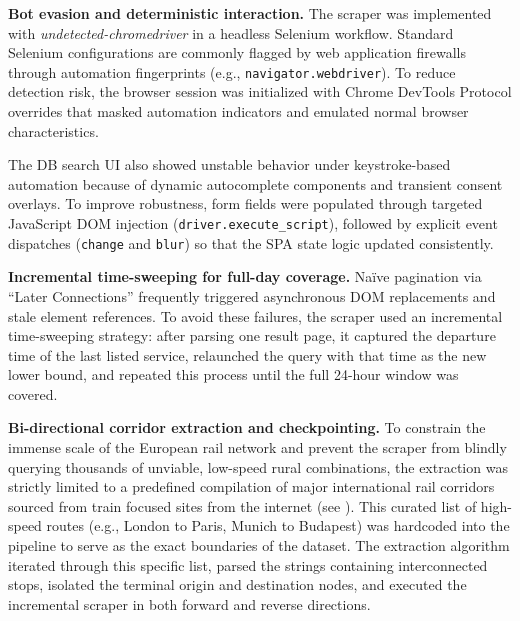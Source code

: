 \medskip

\noindent\textbf{Bot evasion and deterministic interaction.}
The scraper was implemented with \textit{undetected-chromedriver} in a headless Selenium workflow. Standard Selenium configurations are commonly flagged by web application firewalls through automation fingerprints (e.g., \texttt{navigator.webdriver}). To reduce detection risk, the browser session was initialized with Chrome DevTools Protocol overrides that masked automation indicators and emulated normal browser characteristics.

\medskip

The DB search UI also showed unstable behavior under keystroke-based automation because of dynamic autocomplete components and transient consent overlays. To improve robustness, form fields were populated through targeted JavaScript DOM injection (\texttt{driver.execute\_script}), followed by explicit event dispatches (\texttt{change} and \texttt{blur}) so that the SPA state logic updated consistently.

\medskip

\noindent\textbf{Incremental time-sweeping for full-day coverage.}
Na\"ive pagination via ``Later Connections'' frequently triggered asynchronous DOM replacements and stale element references. To avoid these failures, the scraper used an incremental time-sweeping strategy: after parsing one result page, it captured the departure time of the last listed service, relaunched the query with that time as the new lower bound, and repeated this process until the full 24-hour window was covered.

\medskip

\noindent\textbf{Bi-directional corridor extraction and checkpointing.}
To constrain the immense scale of the European rail network and prevent the scraper from blindly querying thousands of unviable, low-speed rural combinations, the extraction was strictly limited to a predefined compilation of major international rail corridors sourced from train focused sites from the internet (see \cite{showmethejourney}). This curated list of high-speed routes (e.g., London to Paris, Munich to Budapest) was hardcoded into the pipeline to serve as the exact boundaries of the dataset. The extraction algorithm iterated through this specific list, parsed the strings containing interconnected stops, isolated the terminal origin and destination nodes, and executed the incremental scraper in both forward and reverse directions.

\medskip

